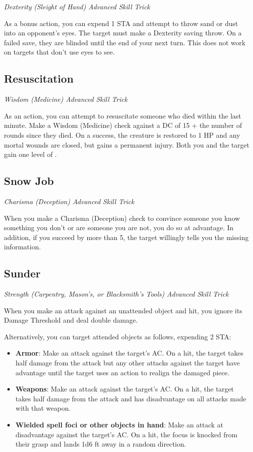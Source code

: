 \textit{Dexterity (Sleight of Hand) Advanced Skill Trick}

As a bonus action, you can expend 1 STA and attempt to throw sand or dust into an opponent's eyes. The target must make a Dexterity saving throw. On a failed save, they are blinded until the end of your next turn. This does not work on targets that don't use eyes to see.

\subsection{Resuscitation}

\textit{Wisdom (Medicine) Advanced Skill Trick}

As an action, you can attempt to resuscitate someone who died within the last minute. Make a Wisdom (Medicine) check against a DC of 15 + the number of rounds since they died. On a success, the creature is restored to 1 HP and any mortal wounds are closed, but gains a permanent injury. Both you and the target gain one level of . 

\subsection{Snow Job}

\textit{Charisma (Deception) Advanced Skill Trick}

When you make a Charisma (Deception) check to convince someone you know something you don't or are someone you are not, you do so at advantage. In addition, if you succeed by more than 5, the target willingly tells you the missing information.

\subsection{Sunder}

\textit{Strength (Carpentry, Mason's, or Blacksmith's Tools) Advanced Skill Trick}

When you make an attack against an unattended object and hit, you ignore its Damage Threshold and deal double damage. 

Alternatively, you can target attended objects as follows, expending 2 STA:
\begin{itemize}
	\item \textbf{Armor}: Make an attack against the target's AC. On a hit, the target takes half damage from the attack but any other attacks against the target have advantage until the target uses an action to realign the damaged piece.
	\item \textbf{Weapons}: Make an attack against the target's AC. On a hit, the target takes half damage from the attack and has disadvantage on all attacks made with that weapon.
	\item \textbf{Wielded spell foci or other objects in hand}: Make an attack at disadvantage against the target's AC. On a hit, the focus is knocked from their grasp and lands 1d6  ft away in a random direction.
\end{itemize}

